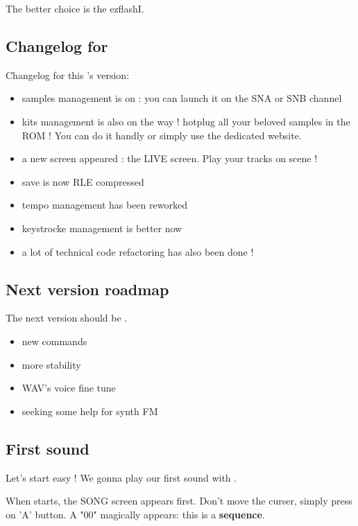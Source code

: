 \documentclass[12pt,a4paper]{article}
\begin{document}
    \medskip The better choice is the ezflashI.

    \subsection{Changelog for \fatversion}
    
    Changelog for this \FAT's version: \medskip
    \begin{itemize}
        \item{samples management is on : you can launch it on the SNA or SNB channel}
        \item{kits management is also on the way ! hotplug all your beloved samples in the ROM ! You can do it handly or simply use the dedicated website.}
        \item{a new screen appeared : the LIVE screen. Play your tracks on scene !}
	    \item{save is now RLE compressed}
	    \item{tempo management has been reworked}
        \item{keystrocke management is better now}
  	    \item{a lot of technical code refactoring has also been done !}
    \end{itemize}
    
    \subsection{Next version roadmap}
    
    The next version should be \fatnextversion. \medskip
    \begin{itemize}
        \item{new commands}
        \item{more stability}
        \item{WAV's voice fine tune}
        \item{seeking some help for synth FM}
    \end{itemize}
    
    \subsection{First sound}

    Let's start easy ! We gonna play our first sound with \FAT.\medskip
    
    When \FAT starts, the SONG screen appears first. Don't move the curser, simply press on 'A' button.
    A "00" magically appears: this is a {\bf sequence}.
    
\end{document}
